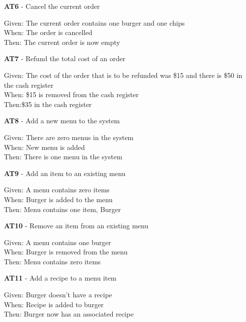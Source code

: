 \linebreak
\textbf{AT6} - Cancel the current order\\
\begin{small}
Given: The current order contains one burger and one chips\\
When: The order is cancelled\\
Then: The current order is now empty\\
\end{small}
\linebreak
\textbf{AT7} - Refund the total cost of an order\\
\begin{small}
Given: The cost of the order that is to be refunded was \$15 and there is \$50 in the cash register\\
When: \$15 is removed from the cash register\\
Then:\$35 in the cash register\\
\end{small}
\linebreak
\textbf{AT8} - Add a new menu to the system\\
\begin{small}
Given: There are zero menus in the system\\
When: New menu is added\\
Then: There is one menu in the system\\
\end{small}
\linebreak
\textbf{AT9} - Add an item to an existing menu\\
\begin{small}
Given: A menu contains zero items\\
When: Burger is added to the menu\\
Then: Menu contains one item, Burger\\
\end{small}
\linebreak
\textbf{AT10} - Remove an item from an existing menu\\
\begin{small}
Given: A menu contains one burger\\
When: Burger is removed from the menu\\
Then: Menu contains zero items\\
\end{small}
\linebreak
\textbf{AT11} - Add a recipe to a menu item\\
\begin{small}
Given: Burger doesn't have a recipe\\
When: Recipe is added to burger\\
Then: Burger now has an associated recipe\\
\end{small}
\pagebreak

